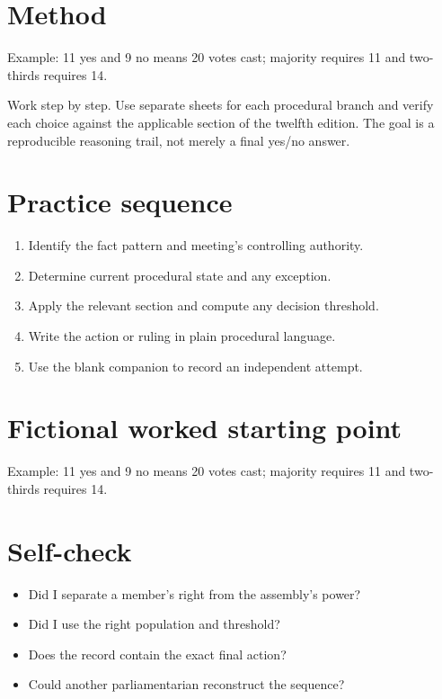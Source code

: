 \documentclass[11pt]{article}
\begin{document}
\SuiteOpen
\section{Method}
Example: 11 yes and 9 no means 20 votes cast; majority requires 11 and two-thirds requires 14.

Work step by step. Use separate sheets for each procedural branch and verify each choice against the applicable section of the twelfth edition. The goal is a reproducible reasoning trail, not merely a final yes/no answer.

\section{Practice sequence}
\begin{enumerate}[leftmargin=*,itemsep=4pt]
\item Identify the fact pattern and meeting’s controlling authority.
\item Determine current procedural state and any exception.
\item Apply the relevant section and compute any decision threshold.
\item Write the action or ruling in plain procedural language.
\item Use the blank companion to record an independent attempt.
\end{enumerate}

\section{Fictional worked starting point}
Example: 11 yes and 9 no means 20 votes cast; majority requires 11 and two-thirds requires 14.

\section{Self-check}
\begin{itemize}[leftmargin=*,itemsep=4pt]
\item Did I separate a member’s right from the assembly’s power?
\item Did I use the right population and threshold?
\item Does the record contain the exact final action?
\item Could another parliamentarian reconstruct the sequence?
\end{itemize}
\end{document}
